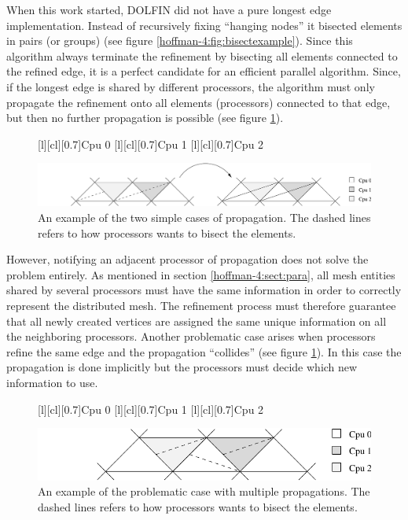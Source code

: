 When this work started, DOLFIN did not have a pure longest edge
implementation. Instead of recursively fixing ``hanging nodes'' it
bisected elements in pairs (or groups) (see figure
\ref{hoffman-4:fig:bisectexample}). Since this algorithm always terminate the
refinement by bisecting all elements connected to the refined edge, it
is a perfect candidate for an efficient parallel algorithm. Since, if the
longest edge is shared by different processors, the algorithm must
only propagate the refinement onto all elements (processors) connected
to that edge, but then no further propagation is possible (see figure
\ref{hoffman-4:fig:prop}).
\begin{figure}[htb]
 [l][cl][0.7]{Cpu 0}
 [l][cl][0.7]{Cpu 1}
 [l][cl][0.7]{Cpu 2}
  \begin{center}
    \includegraphics[width=0.95\columnwidth]{chapters/hoffman-4/pdf/prop.pdf}
  \end{center}
   \caption{An example of the two simple cases of propagation. The dashed lines refers to how processors wants to bisect the elements.}
   \label{hoffman-4:fig:prop}
\end{figure}

However, notifying an adjacent processor of propagation does not solve
the problem entirely. As mentioned in section \ref{hoffman-4:sect:para}, all
mesh entities shared by several processors must have the same
information in order to correctly represent the distributed mesh. The
refinement process must therefore guarantee that all newly created
vertices are assigned the same unique information on all the
neighboring processors. Another problematic case arises when
processors refine the same edge and the propagation ``collides'' (see
figure \ref{hoffman-4:fig:prop}). In this case the propagation is done
implicitly but the processors must decide which new information
to use.
\begin{figure}[htb]
 [l][cl][0.7]{Cpu 0} [l][cl][0.7]{Cpu 1}
 [l][cl][0.7]{Cpu 2} \begin{center}
 \includegraphics[width=0.65\columnwidth]{chapters/hoffman-4/pdf/propprob.pdf}
 \end{center} \caption{An example of the problematic case with
 multiple propagations. The dashed lines refers to how processors
 wants to bisect the elements.}  \label{hoffman-4:fig:propprob}
\end{figure}

